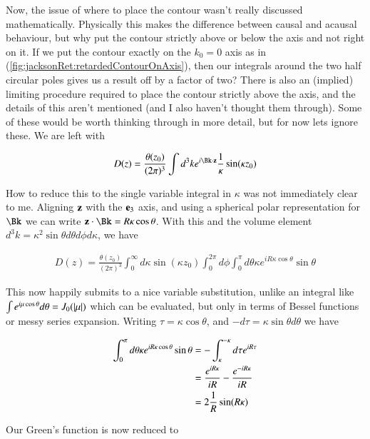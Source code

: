 Now, the issue of where to place the contour wasn't really discussed mathematically.  Physically this makes the difference between causal and acausal behaviour, but why put the contour strictly above or below the axis and not right on it.  If we put the contour exactly on the $k_0 = 0$ axis as in (\ref{fig:jacksonRet:retardedContourOnAxis}), then our integrals around the two half circular poles gives us a result off by a factor of two?  There is also an (implied) limiting procedure required to place the contour strictly above the axis, and the details of this aren't mentioned (and I also haven't thought them through).  Some of these would be worth thinking through in more detail, but for now lets ignore these.  We are left with

\begin{align}\label{eqn:jacksonRet:boo14}
D(z) = \frac{\theta(z_0)}{(2\pi)^3} \int d^3 k e^{i \Bk \cdot \Bz} \inv{\kappa} \sin(\kappa z_0)
\end{align}

How to reduce this to the single variable integral in $\kappa$ was not immediately clear to me.  Aligning $\mathbf{z}$ with the $\mathbf{e}_3$ axis, and using a spherical polar representation for $\Bk$ we can write $\Bz \cdot \Bk = R \kappa \cos\theta$.  With this and the volume element $d^3 k = \kappa^2 \sin\theta d\theta d\phi d\kappa$, we have

\begin{align}\label{eqn:jacksonRet:boo15}
D(z) = \frac{\theta(z_0)}{(2\pi)^3} \int_0^\infty d\kappa \sin(\kappa z_0) \int_0^{2\pi} d\phi \int_0^\pi d\theta \kappa e^{i R \kappa \cos\theta} \sin\theta
\end{align}

This now happily submits to a nice variable substitution, unlike an integral like $\int e^{i \mu \cos\theta} d\theta = J_0(\left\lvert{\mu}\right\rvert)$ which can be evaluated, but only in terms of Bessel functions or messy series expansion.  Writing $\tau = \kappa \cos\theta$, and $-d\tau = \kappa \sin\theta d\theta$ we have

\begin{align*}
\int_0^\pi d\theta \kappa e^{i R \kappa \cos\theta} \sin\theta
&=
-\int_{\kappa}^{-\kappa} d\tau e^{i R \tau} \\
&=
\frac{e^{i R \kappa}}{i R} -\frac{e^{-i R \kappa}}{i R} \\
&=
2 \frac{1}{R} \sin(R \kappa)
\end{align*}

Our Green's function is now reduced to

